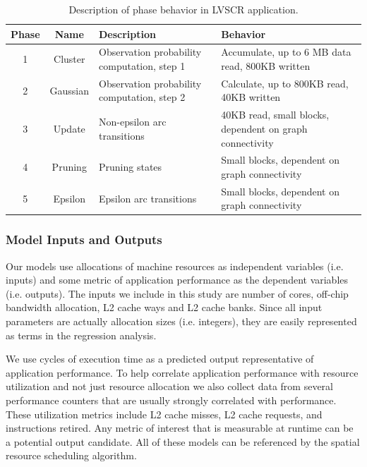 \begin{table}[t]
\footnotesize
\begin{tabular}{|c|c|l|l|}
\hline
 Phase  & Name & Description & Behavior \\ \hline
 1 & Cluster  & Observation probability computation, step 1 &  Accumulate, up to 6 MB data read, 800KB written\\ \hline
 2 & Gaussian  & Observation probability computation, step 2 &  Calculate, up to 800KB read, 40KB written\\ \hline
 3 & Update & Non-epsilon arc transitions &40KB read, small blocks, dependent on graph connectivity\\ \hline
 4 & Pruning & Pruning states & Small blocks, dependent on graph connectivity\\ \hline
 5 & Epsilon & Epsilon arc transitions & Small blocks, dependent on graph connectivity\\ \hline
\end{tabular}
\caption{Description of phase behavior in LVSCR application.}
\label{table:app}
\end{table}

\subsubsection*{Model Inputs and Outputs}
Our models use allocations of machine resources as independent variables (i.e. inputs) and some metric of application performance as the dependent variables (i.e. outputs).  The inputs we include in this study are number of cores, off-chip bandwidth allocation, L2 cache ways and L2 cache banks.  Since all input parameters are actually allocation sizes (i.e. integers), they are easily represented as terms in the regression analysis.

We use cycles of execution time as a predicted output representative of application performance.  To help correlate application performance with resource utilization and not just resource allocation we also collect data from several performance counters that are usually strongly correlated with performance. These utilization metrics include L2 cache misses, L2 cache requests, and instructions retired. Any metric of interest that is measurable at runtime can be a potential output candidate. All of these models can be referenced by the spatial resource scheduling algorithm.


